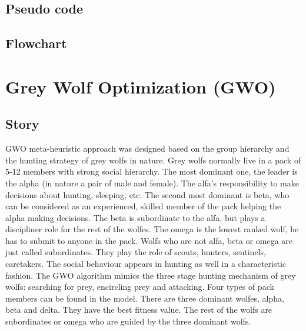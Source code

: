 \documentclass[border=0.2cm]{report}
\begin{document}
\section{Pseudo code}
\section{Flowchart}

\chapter{Grey Wolf Optimization (GWO)}
\section{Story}

GWO \cite{gwo1} meta-heuristic approach was designed based on the group hierarchy and the hunting strategy of grey wolfs in nature. Grey wolfs normally live in a pack of 5-12 members with strong social hierarchy. The most dominant one, the leader is the alpha (in nature a pair of male and female). The alfa's responsibility to make decisions about hunting, sleeping, etc. The second most dominant is beta, who can be considered as an experienced, skilled member of the pack helping the alpha making decisions. The beta is subordinate to the alfa, but plays a discipliner role for the rest of the wolfes. The omega is the lowest ranked wolf, he has to submit to anyone in the pack. Wolfs who are not alfa, beta or omega are just called subordinates. They play the role of scouts, hunters, sentinels, caretakers. The social behaviour appears in hunting as well in a characteristic fashion. The GWO algorithm mimics the three stage hunting mechanism of grey wolfs: searching for prey, encircling prey and attacking. Four types of pack members can be found in the model. There are three dominant wolfes, alpha, beta and delta. They have the best fitness value. The rest of the wolfs are subordinates or omega who are guided by the three dominant wolfs. \\
\end{document}
